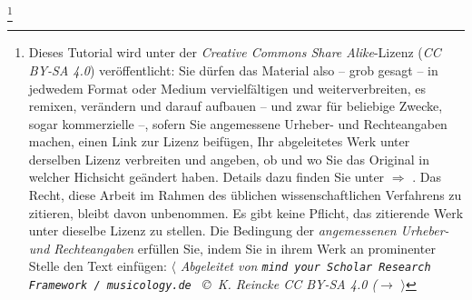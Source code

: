 %
%
%

\footnote{Dieses Tutorial wird unter der \emph{Creative Commons Share Alike}-Lizenz
(\emph{CC BY-SA 4.0}) veröffentlicht: Sie dürfen das Material also -- grob
gesagt -- in jedwedem Format oder Medium vervielfältigen und weiterverbreiten,
es remixen, verändern und darauf aufbauen -- und zwar für beliebige Zwecke,
sogar kommerzielle --, sofern Sie angemessene Urheber- und Rechteangaben machen,
einen Link zur Lizenz beifügen, Ihr abgeleitetes Werk unter derselben Lizenz
verbreiten und angeben, ob und wo Sie das Original in welcher Hichsicht geändert
haben. Details dazu finden Sie unter $\Rightarrow$
.
Das Recht, diese Arbeit im Rahmen des üblichen wissenschaftlichen Verfahrens zu
zitieren, bleibt davon unbenommen. Es gibt keine Pflicht, das zitierende Werk
unter dieselbe Lizenz zu stellen. Die Bedingung der \emph{an\-ge\-mes\-se\-nen
Urheber- und Rechteangaben} erfüllen Sie, indem Sie in ihrem Werk an prominenter
Stelle den Text einfügen: $\langle$ {\itshape Abgeleitet von \texttt{mind your
Scholar Research Framework / musicology.de } \copyright\ K. Reincke CC BY-SA 4.0
($\rightarrow$
 }
$\rangle$ }

